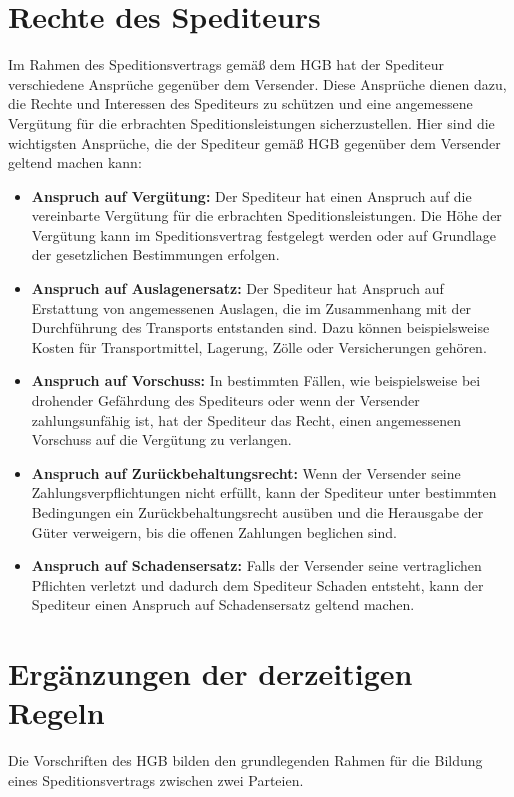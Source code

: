 \section{Rechte des Spediteurs}
Im Rahmen des Speditionsvertrags gemäß dem HGB hat der Spediteur verschiedene Ansprüche gegenüber dem Versender. Diese Ansprüche dienen dazu, die Rechte und Interessen des Spediteurs zu schützen und eine angemessene Vergütung für die erbrachten Speditionsleistungen sicherzustellen. Hier sind die wichtigsten Ansprüche, die der Spediteur gemäß HGB gegenüber dem Versender geltend machen kann:
\begin{itemize}
    \item \textbf{Anspruch auf Vergütung:} Der Spediteur hat einen Anspruch auf die vereinbarte Vergütung für die erbrachten Speditionsleistungen. Die Höhe der Vergütung kann im Speditionsvertrag festgelegt werden oder auf Grundlage der gesetzlichen Bestimmungen erfolgen.
    \item \textbf{Anspruch auf Auslagenersatz:} Der Spediteur hat Anspruch auf Erstattung von angemessenen Auslagen, die im Zusammenhang mit der Durchführung des Transports entstanden sind. Dazu können beispielsweise Kosten für Transportmittel, Lagerung, Zölle oder Versicherungen gehören.
    \item \textbf{Anspruch auf Vorschuss:} In bestimmten Fällen, wie beispielsweise bei drohender Gefährdung des Spediteurs oder wenn der Versender zahlungsunfähig ist, hat der Spediteur das Recht, einen angemessenen Vorschuss auf die Vergütung zu verlangen.
    \item \textbf{Anspruch auf Zurückbehaltungsrecht:} Wenn der Versender seine Zahlungsverpflichtungen nicht erfüllt, kann der Spediteur unter bestimmten Bedingungen ein Zurückbehaltungsrecht ausüben und die Herausgabe der Güter verweigern, bis die offenen Zahlungen beglichen sind.
    \item \textbf{Anspruch auf Schadensersatz:} Falls der Versender seine vertraglichen Pflichten verletzt und dadurch dem Spediteur Schaden entsteht, kann der Spediteur einen Anspruch auf Schadensersatz geltend machen.
\end{itemize}

\section{Ergänzungen der derzeitigen Regeln}
Die Vorschriften des HGB bilden den grundlegenden Rahmen für die Bildung eines Speditionsvertrags zwischen zwei Parteien.

